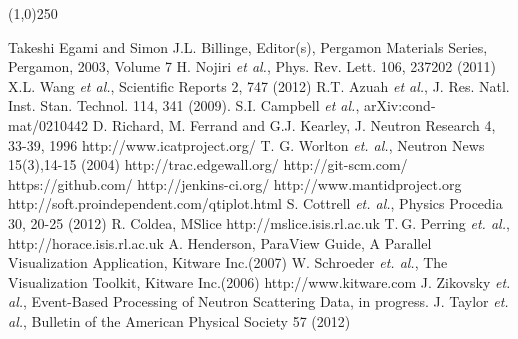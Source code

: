 \documentclass{elsarticle}
\begin{document}
\begin{center}
\line(1,0){250}
\end{center}


\begin{thebibliography}{00}
 Takeshi Egami and Simon J.L. Billinge, Editor(s), Pergamon Materials Series, Pergamon, 2003, Volume 7
 H. Nojiri {\it et al.}, Phys. Rev. Lett. 106, 237202 (2011)
 X.L. Wang {\it et al.}, Scientific Reports 2, 747 (2012)
  R.T. Azuah {\it et al.}, J. Res. Natl. Inst. Stan. Technol. 114, 341 (2009).
 S.I. Campbell {\it et al.}, arXiv:cond-mat/0210442
 D. Richard, M. Ferrand and G.J. Kearley, J. Neutron Research 4, 33-39, 1996
 http://www.icatproject.org/
 T. G. Worlton {\it et. al.}, Neutron News 15(3),14-15 (2004)  
 http://trac.edgewall.org/
 http://git-scm.com/
 https://github.com/
 http://jenkins-ci.org/
 http://www.mantidproject.org
 http://soft.proindependent.com/qtiplot.html
 S. Cottrell {\it et. al.}, Physics Procedia 30, 20-25 (2012)
 R. Coldea, MSlice  http://mslice.isis.rl.ac.uk
 T. G. Perring {\it et. al.}, http://horace.isis.rl.ac.uk
 A. Henderson, ParaView Guide, A Parallel Visualization Application, Kitware Inc.(2007)
 W. Schroeder {\it et. al.}, The Visualization Toolkit, Kitware Inc.(2006)
 http://www.kitware.com
 J. Zikovsky {\it et. al.}, Event-Based Processing of Neutron Scattering Data, in progress.
 J. Taylor {\it et. al.}, Bulletin of the American Physical Society 57 (2012)

\end{thebibliography}
\end{document}
